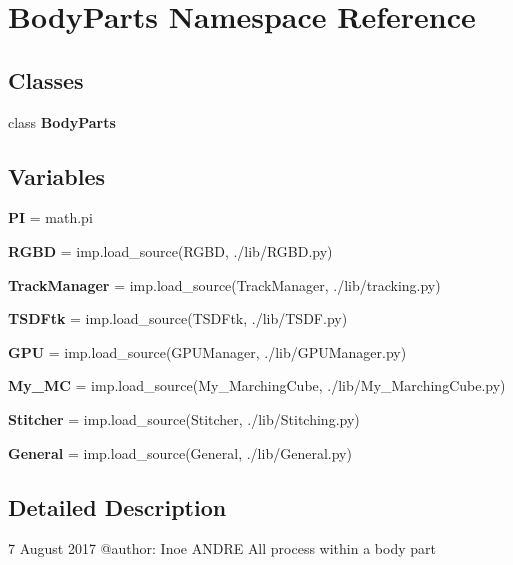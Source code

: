 \section{Body\+Parts Namespace Reference}
\label{namespace_body_parts}
\subsection*{Classes}
\begin{DoxyCompactItemize}
\item 
class \textbf{ Body\+Parts}
\end{DoxyCompactItemize}
\subsection*{Variables}
\begin{DoxyCompactItemize}
\item 
\mbox{\label{namespace_body_parts_a1ab698cf581ff3eb738d64017cb23710}} 
{\bfseries PI} = math.\+pi
\item 
\mbox{\label{namespace_body_parts_ad3cd6431ffd8e5ec138606939797bc27}} 
{\bfseries R\+G\+BD} = imp.\+load\+\_\+source(\textquotesingle{}R\+G\+BD\textquotesingle{}, \textquotesingle{}./lib/R\+G\+B\+D.\+py\textquotesingle{})
\item 
\mbox{\label{namespace_body_parts_aedf6f63744d6b69484e16917c5cb01af}} 
{\bfseries Track\+Manager} = imp.\+load\+\_\+source(\textquotesingle{}Track\+Manager\textquotesingle{}, \textquotesingle{}./lib/tracking.\+py\textquotesingle{})
\item 
\mbox{\label{namespace_body_parts_a0a616cd1ce4a62524bf5d9d748c85f2b}} 
{\bfseries T\+S\+D\+Ftk} = imp.\+load\+\_\+source(\textquotesingle{}T\+S\+D\+Ftk\textquotesingle{}, \textquotesingle{}./lib/T\+S\+D\+F.\+py\textquotesingle{})
\item 
\mbox{\label{namespace_body_parts_ab2dda25c9906c074315d122cef6f94bd}} 
{\bfseries G\+PU} = imp.\+load\+\_\+source(\textquotesingle{}G\+P\+U\+Manager\textquotesingle{}, \textquotesingle{}./lib/G\+P\+U\+Manager.\+py\textquotesingle{})
\item 
\mbox{\label{namespace_body_parts_a6ee768ac808c89ad55a704afe5b4c8b5}} 
{\bfseries My\+\_\+\+MC} = imp.\+load\+\_\+source(\textquotesingle{}My\+\_\+\+Marching\+Cube\textquotesingle{}, \textquotesingle{}./lib/My\+\_\+\+Marching\+Cube.\+py\textquotesingle{})
\item 
\mbox{\label{namespace_body_parts_a4e8d2910ecc9385c64b64376244e328a}} 
{\bfseries Stitcher} = imp.\+load\+\_\+source(\textquotesingle{}Stitcher\textquotesingle{}, \textquotesingle{}./lib/Stitching.\+py\textquotesingle{})
\item 
\mbox{\label{namespace_body_parts_a93bb019b61f671709645f46560d035ee}} 
{\bfseries General} = imp.\+load\+\_\+source(\textquotesingle{}General\textquotesingle{}, \textquotesingle{}./lib/General.\+py\textquotesingle{})
\end{DoxyCompactItemize}


\subsection{Detailed Description}
\begin{DoxyVerb}7 August 2017
@author: Inoe ANDRE
All process within a body part
\end{DoxyVerb}
 